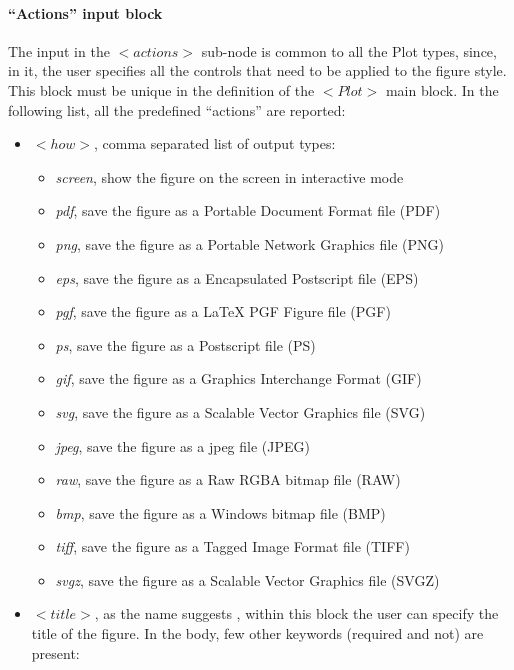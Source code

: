 \paragraph{``Actions'' input block \label{sec:actionsBlock}} 
The input in the $<actions>$ sub-node is common to all the Plot types, since, in it, the user specifies all the controls that need to be applied to the figure style. This block must be unique in the definition of the $<Plot>$ main block. In the following list, all the predefined ``actions'' are reported:
 \vspace{-5mm}
\begin{itemize}
\itemsep0em
\item $<how>$, comma separated list of output types:
     \begin{itemize}
        \item \textit{screen}, show the figure on the screen in interactive mode
        \item \textit{pdf}, save the figure as a Portable Document Format file (PDF)
        \item \textit{png}, save the figure as a Portable Network Graphics file (PNG)
        \item \textit{eps}, save the figure as a Encapsulated Postscript file (EPS)
        \item \textit{pgf}, save the figure as a LaTeX PGF Figure file (PGF)
        \item \textit{ps}, save the figure as a Postscript file (PS)
        \item \textit{gif}, save the figure as a Graphics Interchange Format (GIF)
        \item \textit{svg}, save the figure as a Scalable Vector Graphics file (SVG)
        \item \textit{jpeg}, save the figure as a jpeg file (JPEG)
        \item \textit{raw}, save the figure as a Raw RGBA bitmap file (RAW)
        \item \textit{bmp}, save the figure as a Windows bitmap file (BMP)
        \item \textit{tiff}, save the figure as a Tagged Image Format  file (TIFF)
        \item \textit{svgz}, save the figure as a Scalable Vector Graphics file (SVGZ)
      \end{itemize}
\item $<title>$, as the name suggests , within this block the user can specify the title of the figure. In the body, few other keywords (required and not) are present:


\end{itemize}
